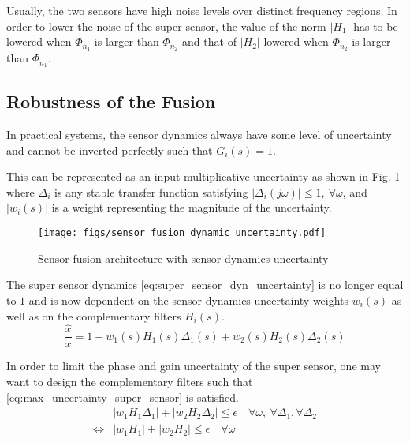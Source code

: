 \documentclass[letterpaper, 10 pt, conference]{ieeeconf}
\begin{document}
Usually, the two sensors have high noise levels over distinct frequency regions.
In order to lower the noise of the super sensor, the value of the norm \(|H_1|\) has to be lowered when \(\Phi_{n_1}\) is larger than \(\Phi_{n_2}\) and that of \(|H_2|\) lowered when \(\Phi_{n_2}\) is larger than \(\Phi_{n_1}\).


\subsection{Robustness of the Fusion}
\label{sec:org1955823}
\label{sec:fusion_robustness}

In practical systems, the sensor dynamics always have some level of uncertainty and cannot be inverted perfectly such that \(G_i(s) = 1\).

This can be represented as an input multiplicative uncertainty as shown in Fig. \ref{fig:sensor_fusion_dynamic_uncertainty} where \(\Delta_i\) is any stable transfer function satisfying \(|\Delta_i(j\omega)| \le 1,\ \forall\omega\), and \(|w_i(s)|\) is a weight representing the magnitude of the uncertainty.

\begin{figure}[htbp]
\centering
\texttt{[image: figs/sensor\_fusion\_dynamic\_uncertainty.pdf]}
\caption{\label{fig:sensor_fusion_dynamic_uncertainty}
Sensor fusion architecture with sensor dynamics uncertainty}
\end{figure}

The super sensor dynamics \eqref{eq:super_sensor_dyn_uncertainty} is no longer equal to \(1\) and is now dependent on the sensor dynamics uncertainty weights \(w_i(s)\) as well as on the complementary filters \(H_i(s)\).
\begin{equation}
\label{eq:super_sensor_dyn_uncertainty}
  \frac{\hat{x}}{x} = 1 + w_1(s) H_1(s) \Delta_1(s) + w_2(s) H_2(s) \Delta_2(s)
\end{equation}

In order to limit the phase and gain uncertainty of the super sensor, one may want to design the complementary filters such that \eqref{eq:max_uncertainty_super_sensor} is satisfied.
\begin{equation}
\label{eq:max_uncertainty_super_sensor}
  \begin{aligned}
    & \left|w_1 H_1 \Delta_1\right| + \left|w_2 H_2 \Delta_2\right| \le \epsilon \quad \forall\omega,\ \forall \Delta_1, \forall \Delta_2\\
    \Leftrightarrow & \left|w_1 H_1\right| + \left|w_2 H_2\right| \le \epsilon \quad \forall\omega
  \end{aligned}
\end{equation}
\end{document}
